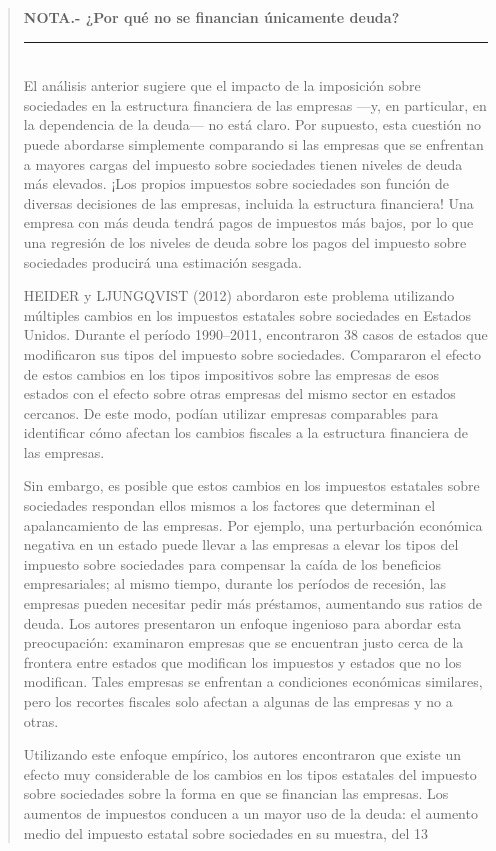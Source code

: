 \documentclass[10pt,a4paper]{article}
\newenvironment{specialblock}[1]{%
      \begin{quote} %
      \small %
      \noindent\textbf{#1}\\[-0.3em] %
      \rule{\linewidth}{0.4pt}\\[0.6em]}{
      \end{quote}}
\begin{document}
\begin{specialblock}{\textbf{NOTA.-} ¿Por qué no se financian únicamente deuda?}
    El análisis anterior sugiere que el impacto de la imposición sobre sociedades en la estructura financiera de las empresas —y, en particular, en la dependencia de la deuda— no está claro. Por supuesto, esta cuestión no puede abordarse simplemente comparando si las empresas que se enfrentan a mayores cargas del impuesto sobre sociedades tienen niveles de deuda más elevados. ¡Los propios impuestos sobre sociedades son función de diversas decisiones de las empresas, incluida la estructura financiera! Una empresa con más deuda tendrá pagos de impuestos más bajos, por lo que una regresión de los niveles de deuda sobre los pagos del impuesto sobre sociedades producirá una estimación sesgada.

    HEIDER y LJUNGQVIST (2012) abordaron este problema utilizando múltiples cambios en los impuestos estatales sobre sociedades en Estados Unidos. Durante el período 1990–2011, encontraron 38 casos de estados que modificaron sus tipos del impuesto sobre sociedades. Compararon el efecto de estos cambios en los tipos impositivos sobre las empresas de esos estados con el efecto sobre otras empresas del mismo sector en estados cercanos. De este modo, podían utilizar empresas comparables para identificar cómo afectan los cambios fiscales a la estructura financiera de las empresas.
    
    Sin embargo, es posible que estos cambios en los impuestos estatales sobre sociedades respondan ellos mismos a los factores que determinan el apalancamiento de las empresas. Por ejemplo, una perturbación económica negativa en un estado puede llevar a las empresas a elevar los tipos del impuesto sobre sociedades para compensar la caída de los beneficios empresariales; al mismo tiempo, durante los períodos de recesión, las empresas pueden necesitar pedir más préstamos, aumentando sus ratios de deuda. Los autores presentaron un enfoque ingenioso para abordar esta preocupación: examinaron empresas que se encuentran justo cerca de la frontera entre estados que modifican los impuestos y estados que no los modifican. Tales empresas se enfrentan a condiciones económicas similares, pero los recortes fiscales solo afectan a algunas de las empresas y no a otras.
    
    Utilizando este enfoque empírico, los autores encontraron que existe un efecto muy considerable de los cambios en los tipos estatales del impuesto sobre sociedades sobre la forma en que se financian las empresas. Los aumentos de impuestos conducen a un mayor uso de la deuda: el aumento medio del impuesto estatal sobre sociedades en su muestra, del 13 %
\end{specialblock}
\end{document}
